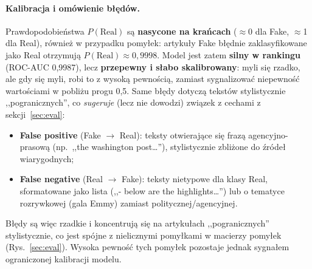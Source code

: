\paragraph{Kalibracja i omówienie błędów.}
Prawdopodobieństwa $P(\text{Real})$ są \textbf{nasycone na krańcach}
($\approx$0 dla Fake, $\approx$1 dla Real), również w przypadku pomyłek: artykuły
Fake błędnie zaklasyfikowane jako Real otrzymują $P(\text{Real})\approx0{,}9998$.
Model jest zatem \textbf{silny w rankingu} (ROC-AUC 0{,}9987), lecz \textbf{przepewny
i słabo skalibrowany}: myli się rzadko, ale gdy się myli, robi to z wysoką pewnością,
zamiast sygnalizować niepewność wartościami w pobliżu progu 0{,}5. Same błędy dotyczą
tekstów stylistycznie ,,pogranicznych'', co \emph{sugeruje} (lecz nie dowodzi)
związek z cechami z sekcji~\ref{sec:eval}:

\begin{itemize}[noitemsep]
  \item \textbf{False positive} (Fake $\to$ Real): teksty otwierające się
        frazą agencyjno-prasową (np.\ ,,the washington post\dots''), stylistycznie
        zbliżone do źródeł wiarygodnych;
  \item \textbf{False negative} (Real $\to$ Fake): teksty nietypowe dla klasy Real,
        sformatowane jako lista (,,- below are the highlights\dots'') lub o tematyce
        rozrywkowej (gala Emmy) zamiast politycznej/agencyjnej.
\end{itemize}

Błędy są więc rzadkie i koncentrują się na artykułach ,,pogranicznych'' stylistycznie,
co jest spójne z nielicznymi pomyłkami w macierzy pomyłek (Rys.~\ref{sec:eval}).
Wysoka pewność tych pomyłek pozostaje jednak sygnałem ograniczonej kalibracji modelu.
